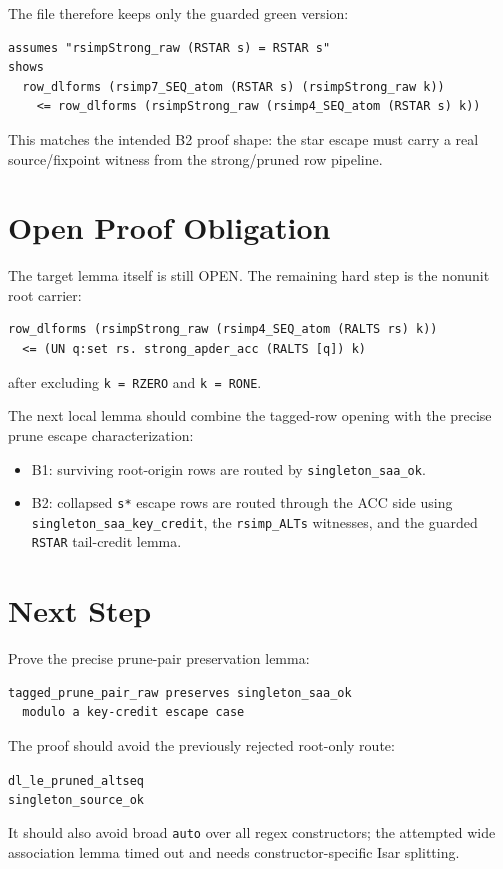 \documentclass[11pt]{article}
\newcommand{\code}[1]{\texttt{\small #1}}
\newcommand{\open}{\textcolor{orange!70!black}{OPEN}}
\begin{document}
The file therefore keeps only the guarded green version:

\begin{verbatim}
assumes "rsimpStrong_raw (RSTAR s) = RSTAR s"
shows
  row_dlforms (rsimp7_SEQ_atom (RSTAR s) (rsimpStrong_raw k))
    <= row_dlforms (rsimpStrong_raw (rsimp4_SEQ_atom (RSTAR s) k))
\end{verbatim}

This matches the intended B2 proof shape: the star escape must carry a real
source/fixpoint witness from the strong/pruned row pipeline.

\section*{Open Proof Obligation}

The target lemma itself is still \open. The remaining hard step is the nonunit
root carrier:

\begin{verbatim}
row_dlforms (rsimpStrong_raw (rsimp4_SEQ_atom (RALTS rs) k))
  <= (UN q:set rs. strong_apder_acc (RALTS [q]) k)
\end{verbatim}

after excluding \code{k = RZERO} and \code{k = RONE}.

The next local lemma should combine the tagged-row opening with the precise
prune escape characterization:

\begin{itemize}
  \item B1: surviving root-origin rows are routed by
    \code{singleton\_saa\_ok}.
  \item B2: collapsed \code{s*} escape rows are routed through the ACC side
    using \code{singleton\_saa\_key\_credit}, the \code{rsimp\_ALTs}
    witnesses, and the guarded \code{RSTAR} tail-credit lemma.
\end{itemize}

\section*{Next Step}

Prove the precise prune-pair preservation lemma:

\begin{verbatim}
tagged_prune_pair_raw preserves singleton_saa_ok
  modulo a key-credit escape case
\end{verbatim}

The proof should avoid the previously rejected root-only route:

\begin{center}
  \code{dl\_le\_pruned\_altseq}\\
  \code{singleton\_source\_ok}
\end{center}

It should also avoid broad \code{auto} over all regex constructors; the
attempted wide association lemma timed out and needs constructor-specific
Isar splitting.
\end{document}
